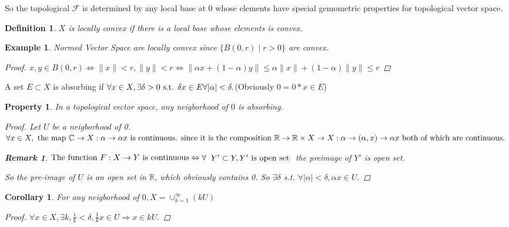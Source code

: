 \documentclass{article}
\newtheorem*{property}{Property}
\newtheorem*{definition}{Definition}
\newtheorem*{remark}{Remark}
\newtheorem*{example}{Example}
\newtheorem*{corollary}{Corollary}
\begin{document}
  So the topological $\mathcal{F}$ is determined by any local base at $0$ 
  whose elements have special gemometric properties for topological vector space.
\begin{definition}
  $X$ is locally convex if there is a local base whose elements is convex.
\end{definition}
\begin{example}
  Normed Vector Space are locally convex since $\{B(0, r) \mid r > 0\}$ are convex.
  \begin{proof}
    $
    x, y \in B(0, r) \Leftrightarrow \|x\| < r, \|y\| < r \Leftrightarrow 
    \|\alpha x + (1 - \alpha)y\| \le \alpha\|x\| + (1 - \alpha)\|y\| \le r
    $
  \end{proof}
\end{example}
A set $E \subset X$ is absorbing if 
$
\forall x \in X, \exists \delta > 0 \textnormal{ s.t. } \delta x \in E 
\forall |\alpha| < \delta.
$(Obviously $0 = 0 * x \in E$)

\begin{property}
In a topological vector space, any neigborhood of $0$ is absorbing.
\begin{proof}
  Let $U$ be a neigborhood of 0. 
  $
  \forall x \in X, \textnormal{ the map } \mathbb{C} \rightarrow X: 
  \alpha \rightarrow \alpha x
  \textnormal{ is continuous. since it is the composition }
  \mathbb{R} \rightarrow \mathbb{R} \times X \rightarrow X: 
  \alpha \rightarrow (\alpha, x) \rightarrow \alpha x 
  \textnormal{ both of which are continuous. }
  $
  \begin{remark}
    $
    \textnormal{The function } F: X \rightarrow Y 
    \textnormal{ is continuous} \Leftrightarrow 
    \forall     
    $
    $
    Y' \subset Y, Y' \textnormal{ is open set }
    $
    the preimage of $Y'$ is open set. 
  \end{remark}
  So the pre-image of $U$ is an open set in $\mathbb{R}$, which obviously contains 0.
  So $\exists \delta$ s.t. $\forall |\alpha| < \delta, \alpha x \in U.$
\end{proof}
\end{property}
\begin{corollary}
  For any neigborhood of $0, X = \cup_{k=1}^{\infty}(kU)$
  \begin{proof}
    $
      \forall x \in X, \exists k, 
      \frac{1}{k} < \delta, \frac{1}{k} x \in U \Rightarrow x \in kU.
    $
  \end{proof}
\end{corollary}
\end{document}
